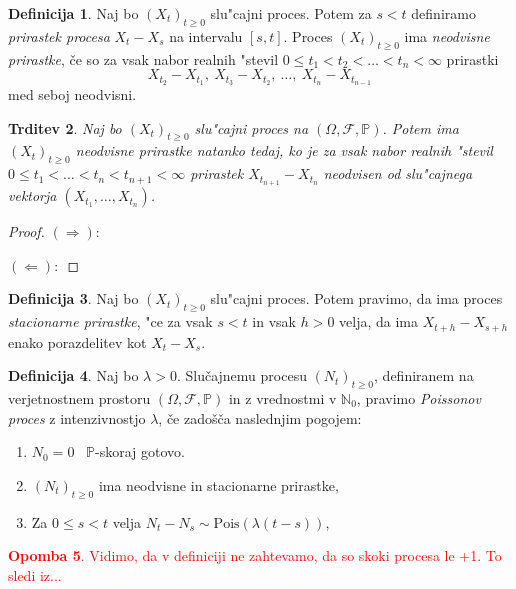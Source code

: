 \documentclass[12pt, a4paper, reqno]{amsart}
\theoremstyle{definition}
\newtheorem{definicija}{Definicija}[section]
\newtheorem{opomba}[definicija]{Opomba}
\theoremstyle{plain}
\newtheorem{trditev}[definicija]{Trditev}
\newcommand{\N}{\mathbb{N}}
\newcommand{\F}{\mathcal{F}}
\newcommand{\Prob}{\mathbb{P}}
\newcommand{\1}{\mathds{1}}
\newcommand{\Pois}[1]{\text{Pois}(#1)}
\begin{document}
    \begin{definicija}
        Naj bo $(X_t)_{t\geq0}$ slu"cajni proces. Potem za $s < t$ definiramo
        \textit{prirastek procesa} $X_t - X_s$ na intervalu $[s, t]$. Proces $(X_t)_{t\geq0}$ ima 
        \textit{neodvisne prirastke}, če so za vsak nabor realnih "stevil
        $0 \leq t_1 < t_2 < \ldots < t_n < \infty$ prirastki
        $$
            X_{t_2} - X_{t_1}, \ X_{t_3} - X_{t_2}, \ \ldots, \ X_{t_n} - X_{t_{n-1}}
        $$
        med seboj neodvisni.
        \label{def:prirastek}
    \end{definicija}

    \begin{trditev}
        Naj bo $(X_t)_{t\geq0}$ slu"cajni proces na $(\Omega, \F, \mathbb{P})$. Potem ima $(X_t)_{t\geq0}$
        neodvisne prirastke natanko tedaj, ko je za vsak nabor realnih "stevil 
        $0 \leq t_1 < \ldots < t_n < t_{n+1} <\infty$ prirastek $X_{t_{n+1}} - X_{t_n}$ neodvisen od
        slu"cajnega vektorja $(X_{t_1}, \dots, X_{t_n})$.
        \label{trd:ekvivKarakterizacija}
    \end{trditev}

    \begin{proof}
        $(\Rightarrow):$

        $(\Leftarrow):$
    \end{proof}

    \begin{definicija}
        Naj bo $(X_t)_{t\geq0}$ slu"cajni proces. Potem pravimo, da ima proces
        \textit{stacionarne prirastke}, "ce za vsak $s < t$ in vsak $h > 0$ velja, 
        da ima $X_{t+h} - X_{s+h}$ enako porazdelitev kot $X_t - X_s$.
        \label{def:stacPrir}
    \end{definicija}

    \begin{definicija}
        Naj bo $\lambda > 0$. Slučajnemu procesu $(N_t)_{t\geq 0}$, definiranem na verjetnostnem 
        prostoru $(\Omega, \mathcal{F}, \mathbb{P})$ in z vrednostmi v $\N_0$, pravimo 
        \textit{Poissonov proces} z intenzivnostjo $\lambda$, če zadošča naslednjim pogojem:
        \begin{enumerate}
            \item $N_0 = 0$ \ $\Prob$-skoraj gotovo.
            \item $(N_t)_{t\geq 0}$ ima neodvisne in stacionarne prirastke,
            \item Za $0 \leq s < t$ velja $ N_t - N_s \sim\Pois{\lambda(t - s)}$,
        \end{enumerate}
        \label{def:HPP}
    \end{definicija}
\textcolor{red}{
    \begin{opomba}
        Vidimo, da v definiciji ne zahtevamo, da so skoki procesa le +1. To sledi iz...
        \label{op:skoki}
    \end{opomba}
}
\end{document}
